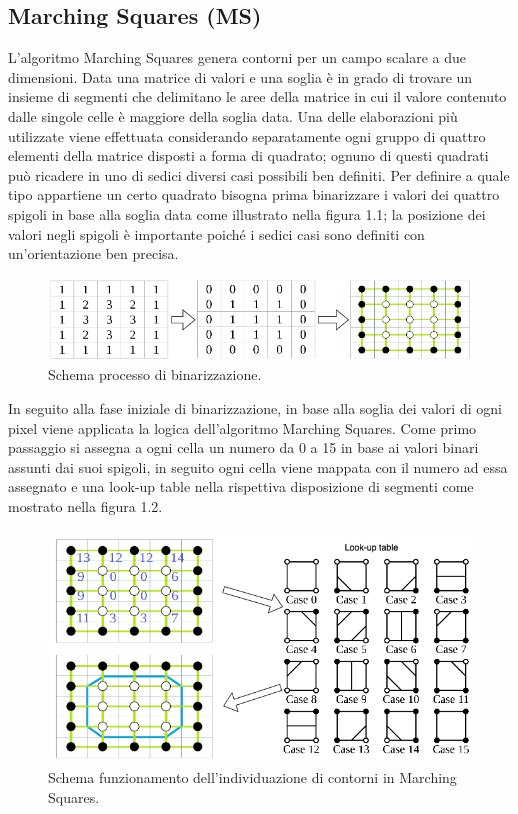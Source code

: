 \documentclass[12pt,a4paper]{report}
\begin{document}
\subsection{Marching Squares (MS)} %
L'algoritmo Marching Squares genera contorni per un campo scalare a due dimensioni. Data una matrice di valori e una soglia è in grado di trovare un insieme di segmenti che delimitano le aree della matrice in cui il valore contenuto dalle singole celle è maggiore della soglia data. 
Una delle elaborazioni più utilizzate viene effettuata considerando separatamente ogni gruppo di quattro elementi della matrice disposti a forma di quadrato; ognuno di questi quadrati può ricadere in uno di sedici diversi casi possibili ben definiti. Per definire a quale tipo appartiene un certo quadrato bisogna prima binarizzare i valori dei quattro spigoli in base alla soglia data come illustrato nella figura 1.1; la posizione dei valori negli spigoli è importante poiché i sedici casi sono definiti con un'orientazione ben precisa. 
\begin{figure}[H]
    \centering
    \includegraphics[scale=0.65]{img/MS2.drawio.png}
    \caption{Schema processo di binarizzazione.}
\end{figure} 
 In seguito alla fase iniziale di binarizzazione, in base alla soglia dei valori di ogni pixel viene applicata la logica dell'algoritmo Marching Squares. Come primo passaggio si assegna a ogni cella un numero da 0 a 15 in base ai valori binari assunti dai suoi spigoli, in seguito ogni cella viene mappata con il numero ad essa assegnato e una look-up table nella rispettiva disposizione di segmenti come mostrato nella figura 1.2.
\begin{figure}[H]
    \centering
    \includegraphics[scale=0.6]{img/MS.drawio.png}
    \caption{Schema funzionamento dell'individuazione di contorni in Marching Squares.}
\end{figure}
\end{document}
